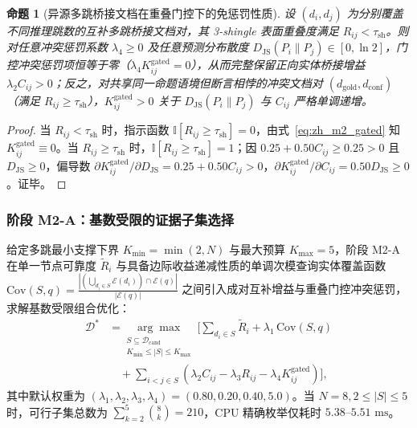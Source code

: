 \documentclass[11pt]{article}
\newtheorem{proposition}{命题}
\begin{document}
\begin{proposition}[异源多跳桥接文档在重叠门控下的免惩罚性质]
\label{prop:zh_bridge}
设 $(d_i, d_j)$ 为分别覆盖不同推理跳数的互补多跳桥接文档对，其 3-shingle 表面重叠度满足 $R_{ij} < \tau_{\text{sh}}$。则对任意冲突惩罚系数 $\lambda_4 \ge 0$ 及任意预测分布散度 $D_{\text{JS}}(P_i \parallel P_j) \in [0, \ln 2]$，门控冲突惩罚项恒等于零（$\lambda_4 K_{ij}^{\text{gated}} = 0$），从而完整保留正向实体桥接增益 $\lambda_2 C_{ij} > 0$；反之，对共享同一命题语境但断言相悖的冲突文档对 $(d_{\text{gold}}, d_{\text{conf}})$（满足 $R_{ij} \ge \tau_{\text{sh}}$），$K_{ij}^{\text{gated}} > 0$ 关于 $D_{\text{JS}}(P_i \parallel P_j)$ 与 $C_{ij}$ 严格单调递增。
\end{proposition}
\begin{proof}
当 $R_{ij} < \tau_{\text{sh}}$ 时，指示函数 $\mathbb{I}[R_{ij} \ge \tau_{\text{sh}}] = 0$，由式~\eqref{eq:zh_m2_gated} 知 $K_{ij}^{\text{gated}} \equiv 0$。当 $R_{ij} \ge \tau_{\text{sh}}$ 时，$\mathbb{I}[R_{ij} \ge \tau_{\text{sh}}] = 1$；因 $0.25 + 0.50 C_{ij} \ge 0.25 > 0$ 且 $D_{\text{JS}} \ge 0$，偏导数 $\partial K_{ij}^{\text{gated}} / \partial D_{\text{JS}} = 0.25 + 0.50 C_{ij} > 0$，$\partial K_{ij}^{\text{gated}} / \partial C_{ij} = 0.50 D_{\text{JS}} \ge 0$。证毕。
\end{proof}

\subsubsection{阶段 M2-A：基数受限的证据子集选择}
给定多跳最小支撑下界 $K_{\min} = \min(2, N)$ 与最大预算 $K_{\max} = 5$，阶段 M2-A 在单一节点可靠度 $\tilde{R}_i$ 与具备边际收益递减性质的单调次模查询实体覆盖函数 $\text{Cov}(S, q) = \frac{|(\bigcup_{d_i \in S}\mathcal{E}(d_i)) \cap \mathcal{E}(q)|}{|\mathcal{E}(q)|}$ 之间引入成对互补增益与重叠门控冲突惩罚，求解基数受限组合优化：
\begin{align}
\mathcal{D}^* &= \underset{\substack{S \subseteq \mathcal{D}_{\text{cand}} \\ K_{\min} \le |S| \le K_{\max}}}{\arg\max} \; \Biggl[ \sum_{d_i \in S} \tilde{R}_i + \lambda_1 \, \text{Cov}(S, q) \nonumber \\
&\quad + \sum_{i < j \in S} \left( \lambda_2 C_{ij} - \lambda_3 R_{ij} - \lambda_4 K_{ij}^{\text{gated}} \right) \Biggr],
\label{eq:zh_m2a}
\end{align}
其中默认权重为 $(\lambda_1, \lambda_2, \lambda_3, \lambda_4) = (0.80, 0.20, 0.40, 5.0)$。当 $N=8, 2 \le |S| \le 5$ 时，可行子集总数为 $\sum_{k=2}^5 \binom{8}{k} = 210$，CPU 精确枚举仅耗时 $5.38\text{--}5.51\text{ ms}$。
\end{document}
